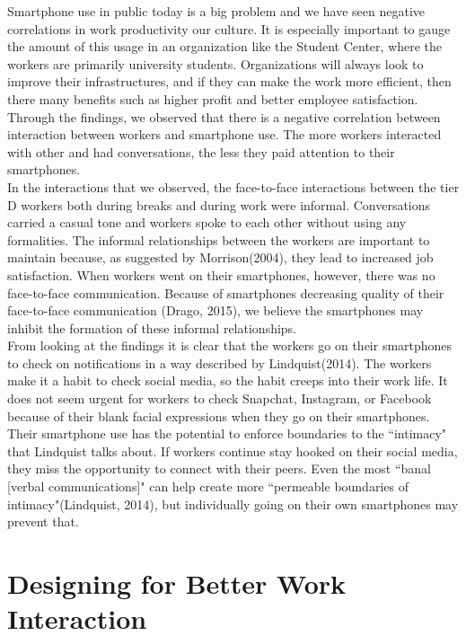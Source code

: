 \documentclass[letterpaper, 12pt]{report}
\begin{document}
	Smartphone use in public today is a big problem and we have seen negative correlations in work productivity our culture. It is especially important to gauge the amount of this usage in an organization like the Student Center, where the workers are primarily university students. Organizations will always look to improve their infrastructures, and if they can make the work more efficient, then there many benefits such as higher profit and better employee satisfaction.\\
	
	Through the findings, we observed that there is a negative correlation between interaction between workers and smartphone use. The more workers interacted with other and had conversations, the less they paid attention to their smartphones.\\
	
	In the interactions that we observed, the face-to-face interactions between the tier D workers both during breaks and during work were informal. Conversations carried a casual tone and workers spoke to each other without using any formalities. The informal relationships between the workers are important to maintain because, as suggested by Morrison(2004), they lead to increased job satisfaction. When workers went on their smartphones, however, there was no face-to-face communication. Because of smartphones decreasing quality of their face-to-face communication (Drago, 2015), we believe the smartphones may inhibit the formation of these informal relationships.\\

	From looking at the findings it is clear that the workers go on their smartphones to check on notifications in a way described by Lindquist(2014). The workers make it a habit to check social media, so the habit creeps into their work life. It does not seem urgent for workers to check Snapchat, Instagram, or Facebook because of their blank facial expressions when they go on their smartphones. Their smartphone use has the potential to enforce boundaries to the ``intimacy" that Lindquist talks about. If workers continue stay hooked on their social media, they miss the opportunity to connect with their peers. Even the most ``banal [verbal communications]" can help create more ``permeable boundaries of intimacy"(Lindquist, 2014), but individually going on their own smartphones may prevent that.\\
	
	\section{Designing for Better Work Interaction}
	
\end{document}
